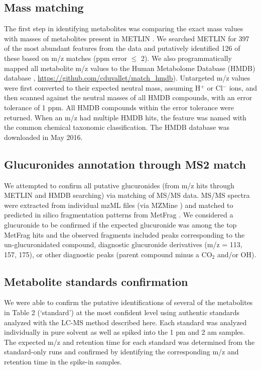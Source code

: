 \subsection{Mass matching}

The first step in identifying metabolites was comparing the exact mass values with masses of metabolites present in METLIN \cite{Tautenhahn2012}. We searched METLIN for 397 of the most abundant features from the data and putatively identified 126 of these based on m/z matches (ppm error $\leq$ 2). We also programmatically mapped all metabolite m/z values to the Human Metabolome Database (HMDB) database \cite{Wishart2013}, \url{https://github.com/cduvallet/match_hmdb}). Untargeted m/z values were first converted to their expected neutral mass, assuming H$^{+}$ or Cl$^{-}$ ions, and then scanned against the neutral masses of all HMDB compounds, with an error tolerance of 1 ppm. All HMDB compounds within the error tolerance were returned. When an m/z had multiple HMDB hits, the feature was named with the common chemical taxonomic classification. The HMDB database was downloaded in May 2016.

\subsection{Glucuronides annotation through MS2 match}

We attempted to confirm all putative glucuronides (from m/z hits through METLIN and HMDB searching) via matching of MS/MS data. MS/MS spectra were extracted from individual mzML files (via MZMine \cite{Pluskal2010}) and matched to predicted in silico fragmentation patterns from MetFrag \cite{Wolf2010}. We considered a glucuronide to be confirmed if the expected glucuronide was among the top MetFrag hits and the observed fragments included peaks corresponding to the un-glucuronidated compound, diagnostic glucuronide derivatives (m/z = 113, 157, 175), or other diagnostic peaks (parent compound minus a CO$_{2}$ and/or OH).

\subsection{Metabolite standards confirmation}

We were able to confirm the putative identifications of several of the metabolites in Table 2 (`standard') at the most confident level using authentic standards analyzed with the LC-MS method described here. Each standard was analyzed individually in pure solvent as well as spiked into the 1 pm and 2 am samples. The expected m/z and retention time for each standard was determined from the standard-only runs and confirmed by identifying the corresponding m/z and retention time in the spike-in samples.

